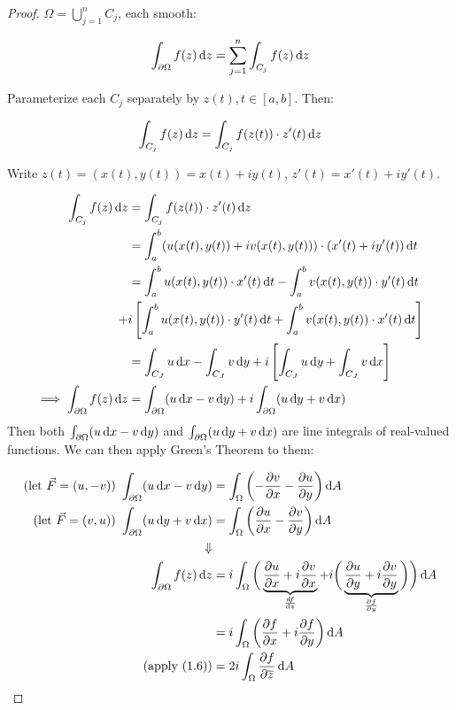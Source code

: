 \begin{proof}
$\Omega = \bigcup_{j=1}^n C_j$, each smooth:

\begin{align*}
    \int_{\partial \Omega} f(z)  \dif z = \sum_{j=1}^n \int_{C_j} f(z) \dif z
\end{align*}

Parameterize each $C_j$ separately by $z(t), t\in[a,b]$. Then:

\begin{align*}
\int_{C_j} f(z)  \dif z = \int_{C_j} f(z(t))\cdot z'(t)  \dif z
\end{align*}

Write $z(t) = (x(t),y(t)) = x(t)+iy(t)$, $z'(t) = x'(t)+iy'(t)$.

\begin{align*}
\int_{C_j} f(z)  \dif z &= \int_{C_j} f(z(t))\cdot z'(t)  \dif z\\
&= \int_a^b (u(x(t),y(t)) + iv(x(t),y(t))) \cdot (x'(t)+iy'(t))  \dif t\\
&= \int_a^b u(x(t),y(t))\cdot x'(t) \dif t - \int_a^b v(x(t),y(t)) \cdot y'(t)  \dif t \\ +&i \left[ \int_a^b u(x(t),y(t))\cdot y'(t) \dif t +  \int_a^b v(x(t),y(t))\cdot x'(t) \dif t  \right]\\
&= \int_{C_J} u \dif x - \int_{C_J} v \dif y + i \left[ \int_{C_J} u \dif y + \int_{C_J} v \dif x \right] \\
\implies \int_{\partial \Omega} f(z)  \dif z &= \int_{\partial \Omega} (u \dif x-v \dif y) + i\int_{\partial \Omega} (u \dif y+v \dif x)
\end{align*}
Then both $\int_{\partial \Omega} (u \dif x-v \dif y)$ and $\int_{\partial \Omega} (u \dif y+v \dif x)$ are line integrals of real-valued functions. We can then apply Green's Theorem to them:

\begin{align*}
    \text{(let $\Vec{F} = (u,-v)$) }\int_{\partial \Omega} (u \dif x-v \dif y) &= \int_\Omega \left( -\frac{\partial v}{\partial x} - \frac{\partial u}{\partial y}  \right)  \dif A\\
    \text{(let $\Vec{F} = (v,u)$) }\int_{\partial \Omega} (u \dif y+v \dif x) &= \int_\Omega \left( \frac{\partial u}{\partial x} - \frac{\partial v}{\partial y}  \right)  \dif A\\
    \Downarrow\\
    \int_{\partial \Omega} f(z) \dif z &= i\int_\Omega \bigg(  \underbrace{\frac{\partial u}{\partial x} + i \frac{\partial v}{\partial x}}_{\frac{df}{ \dif z}} + i \bigg( \underbrace{  \frac{\partial u}{\partial y} + i \frac{\partial v}{\partial y}}_{\frac{\partial f}{\partial y}} \bigg)\bigg) \dif A\\
    &= i \int_\Omega \left( \frac{\partial f}{\partial x} + i\frac{\partial f}{\partial y} \right)  \dif A\\
   \text{(apply (1.6))} &= 2i \int_\Omega \frac{\partial f}{\partial \overline{z}}  \dif A\\
\end{align*}

\end{proof}


